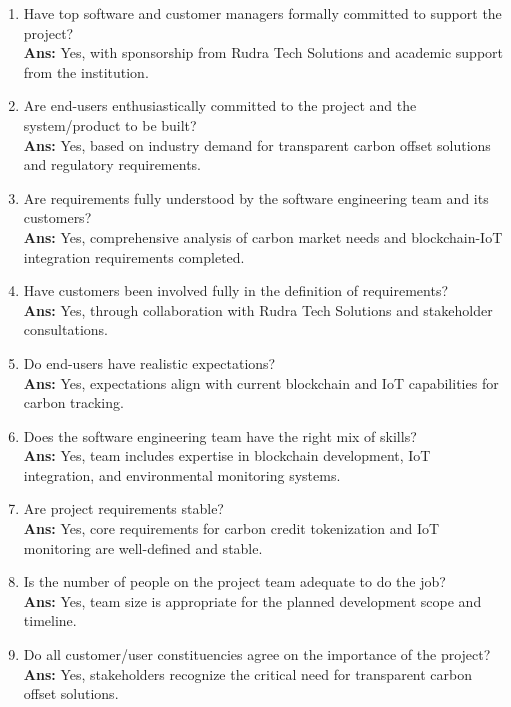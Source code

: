 \documentclass[oneside,a4paper,12pt]{book}
\begin{document}
\begin{enumerate}
    \item Have top software and customer managers formally committed to support the project? \\
    \textbf{Ans:} Yes, with sponsorship from Rudra Tech Solutions and academic support from the institution.

    \item Are end-users enthusiastically committed to the project and the system/product to be built? \\
    \textbf{Ans:} Yes, based on industry demand for transparent carbon offset solutions and regulatory requirements.

    \item Are requirements fully understood by the software engineering team and its customers? \\
    \textbf{Ans:} Yes, comprehensive analysis of carbon market needs and blockchain-IoT integration requirements completed.

    \item Have customers been involved fully in the definition of requirements? \\
    \textbf{Ans:} Yes, through collaboration with Rudra Tech Solutions and stakeholder consultations.

    \item Do end-users have realistic expectations? \\
    \textbf{Ans:} Yes, expectations align with current blockchain and IoT capabilities for carbon tracking.

    \item Does the software engineering team have the right mix of skills? \\
    \textbf{Ans:} Yes, team includes expertise in blockchain development, IoT integration, and environmental monitoring systems.

    \item Are project requirements stable? \\
    \textbf{Ans:} Yes, core requirements for carbon credit tokenization and IoT monitoring are well-defined and stable.

    \item Is the number of people on the project team adequate to do the job? \\
    \textbf{Ans:} Yes, team size is appropriate for the planned development scope and timeline.

    \item Do all customer/user constituencies agree on the importance of the project? \\
    \textbf{Ans:} Yes, stakeholders recognize the critical need for transparent carbon offset solutions.
\end{enumerate}
\end{document}
